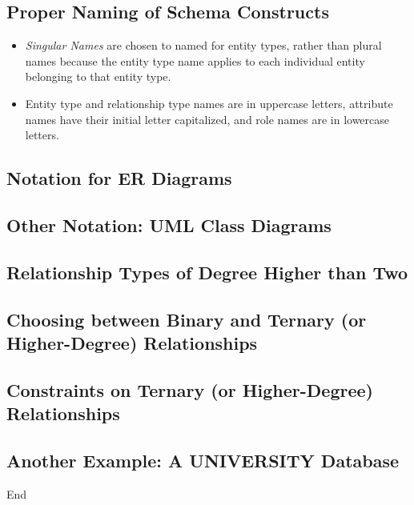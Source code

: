 \documentclass[10pt]{article}
\newcommand{\ti}{\textit}
\begin{document}
\subsection{Proper Naming of Schema Constructs}
\begin{itemize}
	\item \ti{Singular Names} are chosen to named for entity types, rather than plural names because the entity type name applies to each individual entity belonging to that entity type.
	\item Entity type and relationship type names are in uppercase letters, attribute names have their initial letter capitalized, and role names are in lowercase letters. 
\end{itemize}

\subsection{Notation for ER Diagrams}
\bigbreak

\subsection{Other Notation: UML Class Diagrams}

\subsection{Relationship Types of Degree Higher than Two}
\bigbreak

\subsection{Choosing between Binary and Ternary (or Higher-Degree) Relationships}
\bigbreak

\subsection{Constraints on Ternary (or Higher-Degree) Relationships}
\bigbreak

\subsection{Another Example: A UNIVERSITY Database}
\bigbreak

\begin{center}
	End
\end{center}
\pagebreak

\end{document}
